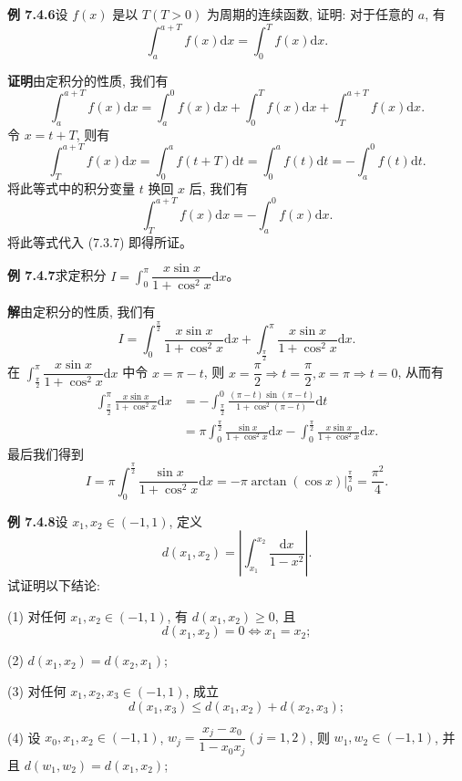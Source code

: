\documentclass[UTF8, 12pt, fontset=fandol, oneside]{ctexart}
\begin{document}
\noindent\textbf{例 7.4.6}\quad 设 $f(x)$ 是以 $T(T>0)$ 为周期的连续函数, 证明: 对于任意的 $a$, 有
\[
  \int_a^{a+T} f(x)\mathrm dx=\int_0^T f(x)\mathrm dx.
\]

\noindent\textbf{证明}\quad 由定积分的性质, 我们有
\begin{equation}
  \int_a^{a+T} f(x)\mathrm dx
  =\int_a^0 f(x)\mathrm dx+\int_0^T f(x)\mathrm dx+\int_T^{a+T} f(x)\mathrm dx.
  \tag{7.3.7}
\end{equation}
令 $x=t+T$, 则有
\[
  \int_T^{a+T} f(x)\mathrm dx
  =\int_0^a f(t+T)\mathrm dt
  =\int_0^a f(t)\mathrm dt
  =-\int_a^0 f(t)\mathrm dt.
\]
将此等式中的积分变量 $t$ 换回 $x$ 后, 我们有
\[
  \int_T^{a+T} f(x)\mathrm dx=-\int_a^0 f(x)\mathrm dx.
\]
将此等式代入 (7.3.7) 即得所证。

\noindent\textbf{例 7.4.7}\quad 求定积分 $I=\int_0^\pi \dfrac{x\sin x}{1+\cos^2 x}\mathrm dx$。

\noindent\textbf{解}\quad 由定积分的性质, 我们有
\[
  I=\int_0^{\frac{\pi}{2}}\frac{x\sin x}{1+\cos^2 x}\mathrm dx
  +\int_{\frac{\pi}{2}}^\pi \frac{x\sin x}{1+\cos^2 x}\mathrm dx.
\]
在 $\int_{\frac{\pi}{2}}^\pi \dfrac{x\sin x}{1+\cos^2 x}\mathrm dx$ 中令 $x=\pi-t$, 则 $x=\dfrac{\pi}{2}\Rightarrow t=\dfrac{\pi}{2},x=\pi\Rightarrow t=0$, 从而有
\[
\begin{aligned}
  \int_{\frac{\pi}{2}}^\pi \frac{x\sin x}{1+\cos^2 x}\mathrm dx
  &=-\int_{\frac{\pi}{2}}^0
  \frac{(\pi-t)\sin(\pi-t)}{1+\cos^2(\pi-t)}\mathrm dt\\
  &=\pi\int_0^{\frac{\pi}{2}}\frac{\sin x}{1+\cos^2 x}\mathrm dx
  -\int_0^{\frac{\pi}{2}}\frac{x\sin x}{1+\cos^2 x}\mathrm dx.
\end{aligned}
\]
最后我们得到
\[
  I=\pi\int_0^{\frac{\pi}{2}}\frac{\sin x}{1+\cos^2 x}\mathrm dx
  =-\left.\pi\arctan(\cos x)\right|_0^{\frac{\pi}{2}}
  =\frac{\pi^2}{4}.
\]

\noindent\textbf{例 7.4.8}\quad 设 $x_1,x_2\in(-1,1)$, 定义
\[
  d(x_1,x_2)=\left|\int_{x_1}^{x_2}\frac{\mathrm dx}{1-x^2}\right|.
\]
试证明以下结论:

(1) 对任何 $x_1,x_2\in(-1,1)$, 有 $d(x_1,x_2)\geq0$, 且
\[
  d(x_1,x_2)=0\Longleftrightarrow x_1=x_2;
\]

(2) $d(x_1,x_2)=d(x_2,x_1)$;

(3) 对任何 $x_1,x_2,x_3\in(-1,1)$, 成立
\[
  d(x_1,x_3)\leq d(x_1,x_2)+d(x_2,x_3);
\]

(4) 设 $x_0,x_1,x_2\in(-1,1)$, $w_j=\dfrac{x_j-x_0}{1-x_0x_j}(j=1,2)$, 则 $w_1,w_2\in(-1,1)$, 并且 $d(w_1,w_2)=d(x_1,x_2)$;
\end{document}
